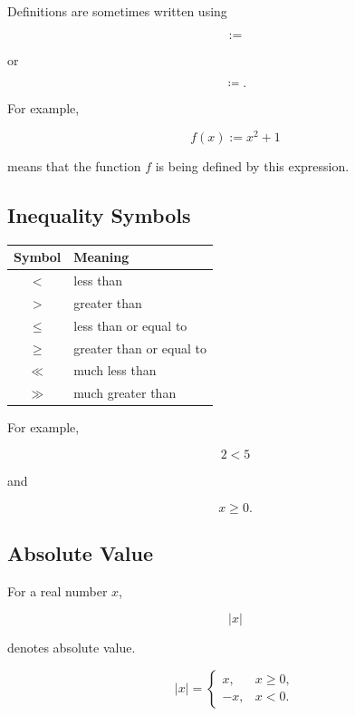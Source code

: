 Definitions are sometimes written using

\[
\boxed{
:=
}
\]

or

\[
\boxed{
\coloneqq.
}
\]

For example,

\[
\boxed{
f(x)
:=
x^2+1
}
\]

means that the function \(f\) is being defined by this expression.

\subsection{Inequality Symbols}
\label{subsec:inequality-symbols}

\begin{center}
\begin{tabular}{c|l}
\textbf{Symbol} & \textbf{Meaning} \\ \hline
\( < \) & less than \\
\( > \) & greater than \\
\( \leq \) & less than or equal to \\
\( \geq \) & greater than or equal to \\
\( \ll \) & much less than \\
\( \gg \) & much greater than
\end{tabular}
\end{center}

For example,

\[
\boxed{
2<5
}
\]

and

\[
\boxed{
x\geq0.
}
\]

\subsection{Absolute Value}
\label{subsec:absolute-value-notation}

For a real number \(x\),

\[
\boxed{
|x|
}
\]

denotes absolute value.

\[
|x|
=
\begin{cases}
x, & x\geq0,\\
-x, & x<0.
\end{cases}
\]


